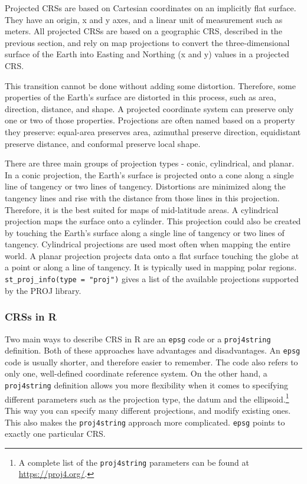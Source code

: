 \documentclass[]{krantz}
\let\rmarkdownfootnote\footnote%
\def\footnote{\protect\rmarkdownfootnote}
\begin{document}
Projected CRSs are based on Cartesian coordinates on an implicitly flat surface.
They have an origin, x and y axes, and a linear unit of measurement such as meters.
All projected CRSs are based on a geographic CRS, described in the previous section, and rely on map projections to convert the three-dimensional surface of the Earth into Easting and Northing (x and y) values in a projected CRS.

This transition cannot be done without adding some distortion.
Therefore, some properties of the Earth's surface are distorted in this process, such as area, direction, distance, and shape.
A projected coordinate system can preserve only one or two of those properties.
Projections are often named based on a property they preserve: equal-area preserves area, azimuthal preserve direction, equidistant preserve distance, and conformal preserve local shape.

There are three main groups of projection types - conic, cylindrical, and planar.
In a conic projection, the Earth's surface is projected onto a cone along a single line of tangency or two lines of tangency.
Distortions are minimized along the tangency lines and rise with the distance from those lines in this projection.
Therefore, it is the best suited for maps of mid-latitude areas.
A cylindrical projection maps the surface onto a cylinder.
This projection could also be created by touching the Earth's surface along a single line of tangency or two lines of tangency.
Cylindrical projections are used most often when mapping the entire world.
A planar projection projects data onto a flat surface touching the globe at a point or along a line of tangency.
It is typically used in mapping polar regions.
\texttt{st\_proj\_info(type\ =\ "proj")} gives a list of the available projections supported by the PROJ library.

\hypertarget{crs-in-r}{%
\subsubsection{CRSs in R}\label{crs-in-r}}

Two main ways to describe CRS in R are an \texttt{epsg} code or a \texttt{proj4string} definition.
Both of these approaches have advantages and disadvantages.
An \texttt{epsg} code is usually shorter, and therefore easier to remember.
The code also refers to only one, well-defined coordinate reference system.
On the other hand, a \texttt{proj4string} definition allows you more flexibility when it comes to specifying different parameters such as the projection type, the datum and the ellipsoid.\footnote{A complete list of the \texttt{proj4string} parameters can be found at \url{https://proj4.org/}.}
This way you can specify many different projections, and modify existing ones.
This also makes the \texttt{proj4string} approach more complicated.
\texttt{epsg} points to exactly one particular CRS.
\end{document}
